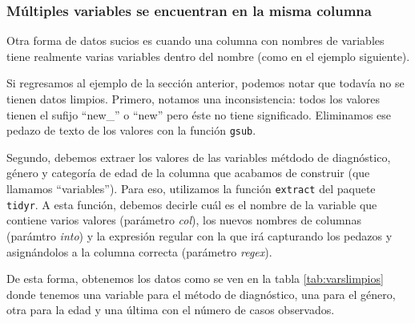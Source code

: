 \documentclass[]{article}
\newenvironment{Shaded}{\begin{snugshade}}{\end{snugshade}}
\newcommand{\KeywordTok}[1]{\textcolor[rgb]{0.13,0.29,0.53}{\textbf{{#1}}}}
\newcommand{\DataTypeTok}[1]{\textcolor[rgb]{0.13,0.29,0.53}{{#1}}}
\newcommand{\StringTok}[1]{\textcolor[rgb]{0.31,0.60,0.02}{{#1}}}
\newcommand{\NormalTok}[1]{{#1}}
\begin{document}
\subsubsection{Múltiples variables se encuentran en la misma
columna}\label{multiples-variables-se-encuentran-en-la-misma-columna}

Otra forma de datos sucios es cuando una columna con nombres de
variables tiene realmente varias variables dentro del nombre (como en el
ejemplo siguiente).

Si regresamos al ejemplo de la sección anterior, podemos notar que
todavía no se tienen datos limpios. Primero, notamos una inconsistencia:
todos los valores tienen el sufijo ``new\_'' o ``new'' pero éste no
tiene significado. Eliminamos ese pedazo de texto de los valores con la
función \texttt{gsub}.

Segundo, debemos extraer los valores de las variables métdodo de
diagnóstico, género y categoría de edad de la columna que acabamos de
construir (que llamamos ``variables''). Para eso, utilizamos la función
\texttt{extract} del paquete \texttt{tidyr}. A esta función, debemos
decirle cuál es el nombre de la variable que contiene varios valores
(parámetro \emph{col}), los nuevos nombres de columnas (parámtro
\emph{into}) y la expresión regular con la que irá capturando los
pedazos y asignándolos a la columna correcta (parámetro \emph{regex}).

\begin{Shaded}
\end{Shaded}

De esta forma, obtenemos los datos como se ven en la tabla
\ref{tab:varslimpios} donde tenemos una variable para el método de
diagnóstico, una para el género, otra para la edad y una última con el
número de casos observados.
\end{document}
